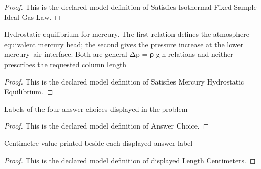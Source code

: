 \begin{proof}
  This is the declared model definition of Satisfies Isothermal Fixed Sample Ideal Gas Law.
\end{proof}
\begin{definition}
  \label{def:physics:phyx-mini-0366:phyxminiproblems-problemphyxmini0366-satisfiesmercuryhydrostaticequilibrium}
  Hydrostatic equilibrium for mercury. The first relation defines the atmosphere-equivalent mercury head; the second gives the pressure increase at the lower mercury--air interface. Both are general Δp = ρ g h relations and neither prescribes the requested column length
\end{definition}
\begin{proof}
  This is the declared model definition of Satisfies Mercury Hydrostatic Equilibrium.
\end{proof}
\begin{definition}
  \label{def:physics:phyx-mini-0366:phyxminiproblems-problemphyxmini0366-answerchoice}
  Labels of the four answer choices displayed in the problem
\end{definition}
\begin{proof}
  This is the declared model definition of Answer Choice.
\end{proof}
\begin{definition}
  \label{def:physics:phyx-mini-0366:phyxminiproblems-problemphyxmini0366-displayedlengthcentimeters}
  Centimetre value printed beside each displayed answer label
\end{definition}
\begin{proof}
  This is the declared model definition of displayed Length Centimeters.
\end{proof}
